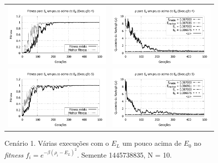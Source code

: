 \begin{figure}[p]
\begin{tabular}{@{}cc@{}}
		\includegraphics[width=.40\textwidth]{figs/resultados/variandoEL/T1E4_fitness.pdf} &
    \includegraphics[width=.40\textwidth]{figs/resultados/variandoEL/T1E4_rho.pdf}   \\
		
		\includegraphics[width=.40\textwidth]{figs/resultados/variandoEL/T1E5_fitness.pdf} &
    \includegraphics[width=.40\textwidth]{figs/resultados/variandoEL/T1E5_rho.pdf}		
  \end{tabular}
  \caption{Cenário 1. Várias execuções com o $E_L$ um pouco acima de $E_0$ no \textit{fitness} $f_i = e^{-\beta(\rho_i - E_L)^2}$. Semente 1445738835, N = 10.}
	\label{fig:variando_EL_pouco_acima}
	\end{figure}
	
